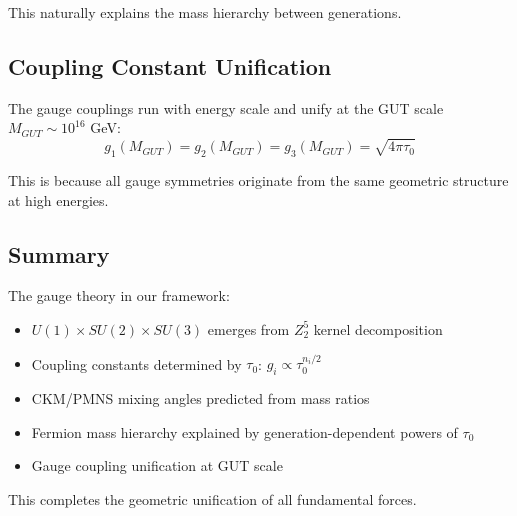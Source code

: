 This naturally explains the mass hierarchy between generations.

\subsection{Coupling Constant Unification}

The gauge couplings run with energy scale and unify at the GUT scale $M_{GUT} \sim 10^{16}$ GeV:
\begin{equation}
    g_1(M_{GUT}) = g_2(M_{GUT}) = g_3(M_{GUT}) = \sqrt{4\pi\tau_0}
\end{equation}

This is because all gauge symmetries originate from the same geometric structure at high energies.

\subsection{Summary}

The gauge theory in our framework:
\begin{itemize}
    \item $U(1) \times SU(2) \times SU(3)$ emerges from $Z_2^5$ kernel decomposition
    \item Coupling constants determined by $\tau_0$: $g_i \propto \tau_0^{n_i/2}$
    \item CKM/PMNS mixing angles predicted from mass ratios
    \item Fermion mass hierarchy explained by generation-dependent powers of $\tau_0$
    \item Gauge coupling unification at GUT scale
\end{itemize}

This completes the geometric unification of all fundamental forces.
